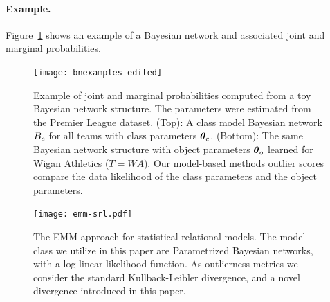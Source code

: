 \documentclass[conference]{IEEEtran}
\begin{document}
\paragraph{Example.} Figure~\ref{fig:bns} shows an example of a Bayesian network and associated joint and marginal probabilities.
%
\begin{figure}[t]
	\centering
	\texttt{[image: bnexamples-edited]}
	\caption{Example of joint and marginal probabilities computed from a toy Bayesian network structure. The parameters were estimated from the  Premier League dataset. (Top): A class model Bayesian network $B_{c}$ for all teams with class parameters $\boldsymbol{\theta}_{c}$. (Bottom): The same Bayesian network structure with object parameters $\boldsymbol{\theta}_{o}$ learned for Wigan Athletics ($T = WA$). Our model-based methods outlier scores compare the data likelihood of the class parameters and the object parameters.
		\label{fig:bns}
		}
\end{figure}


\begin{figure}[htbp]
\centering
\texttt{[image: emm-srl.pdf]}
\caption{The EMM approach for statistical-relational models. The model class we utilize in this paper are Parametrized Bayesian networks, with a log-linear likelihood function. As outlierness metrics we consider the standard Kullback-Leibler divergence, and a novel divergence introduced in this paper.
\label{fig:flow}}
\end{figure}
%				
%				
%				
%				
				
%					
%					
\end{document}
